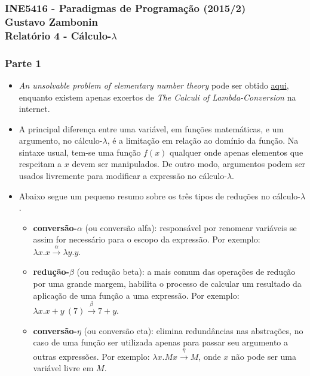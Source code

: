 \documentclass{article}
\begin{document}
\subsubsection*{INE5416 - Paradigmas de Programação (2015/2) \\
    Gustavo Zambonin \\
    Relatório 4 - Cálculo-$\lambda$
}

\subsubsection*{Parte 1}
\begin{itemize}
    \item \textit{An unsolvable problem of elementary number theory} pode ser obtido \href{http://www.ics.uci.edu/~lopes/teaching/inf212W12/readings/church.pdf}{aqui}, enquanto existem apenas excertos de \textit{The Calculi of Lambda-Conversion} na internet.
    \item A principal diferença entre uma variável, em funções matemáticas, e um argumento, no cálculo-$\lambda$, é a limitação em relação ao domínio da função. Na sintaxe usual, tem-se uma função $f(x)$ qualquer onde apenas elementos que respeitam a $x$ devem ser manipulados. De outro modo, argumentos podem ser usados livremente para modificar a expressão no cálculo-$\lambda$.
    \item Abaixo segue um pequeno resumo sobre os três tipos de reduções no cálculo-$\lambda$.
    \begin{itemize}
        \item \textbf{conversão-$\alpha$} (ou conversão alfa): responsável por renomear variáveis se assim for necessário para o escopo da expressão. Por exemplo: $\lambda x.x \stackrel{\alpha}{\rightarrow} \lambda y.y$.
        \item \textbf{redução-$\beta$} (ou redução beta): a mais comum das operações de redução por uma grande margem, habilita o processo de calcular um resultado da aplicação de uma função a uma expressão. Por exemplo: $\lambda x.x + y\ (7) \stackrel{\beta}{\rightarrow} 7 + y$.
        \item \textbf{conversão-$\eta$} (ou conversão eta): elimina redundâncias nas abstrações, no caso de uma função ser utilizada apenas para passar seu argumento a outras expressões. Por exemplo: $\lambda x.Mx \stackrel{\eta}{\rightarrow} M$, onde $x$ não pode ser uma variável livre em $M$.
    \end{itemize}
\end{itemize}
\end{document}
